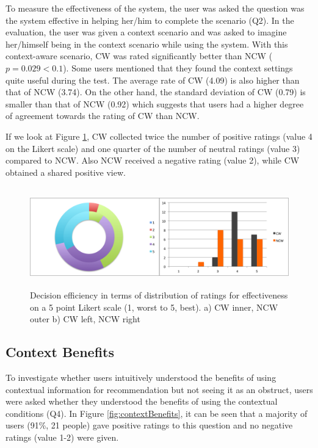 To measure the effectiveness of the system, the user was asked the question was the system effective in helping her/him to complete the scenario (Q2). In the evaluation, the user was given a context scenario and was asked to imagine her/himself being in the context scenario while using the system. With this context-aware scenario, CW was rated significantly better than NCW ($p=0.029 < 0.1$). Some users mentioned that they found the context settings quite useful during the test. The average rate of CW (4.09) is also higher than that of NCW (3.74). On the other hand, the standard deviation of CW (0.79) is smaller than that of NCW (0.92) which suggests that users had a higher degree of agreement towards the rating of CW than NCW.

If we look at Figure \ref{fig:effectiveness}, CW collected twice the number of positive ratings (value 4 on the Likert scale) and one quarter of the number of neutral ratings (value 3) compared to NCW. Also NCW received a negative rating (value 2), while CW obtained a shared positive view.

\begin{figure}[H]
	\centering
	\includegraphics[height=1.7in]{figures/effectiveness.png}
	\caption{Decision efficiency in terms of distribution of ratings for effectiveness on a 5 point Likert scale (1, worst to 5, best). a) CW inner, NCW outer b) CW left, NCW right}
	\label{fig:effectiveness}
\end{figure}

\subsection{Context Benefits} \label{sec:results_cb}

To investigate whether users intuitively understood the benefits of using contextual information for recommendation but not seeing it as an obstruct, users were asked whether they understood the benefits of using the contextual conditions (Q4). In Figure \ref{fig:contextBenefits}, it can be seen that a majority of users (91\%, 21 people) gave positive ratings to this question and no negative ratings (value 1-2) were given.

